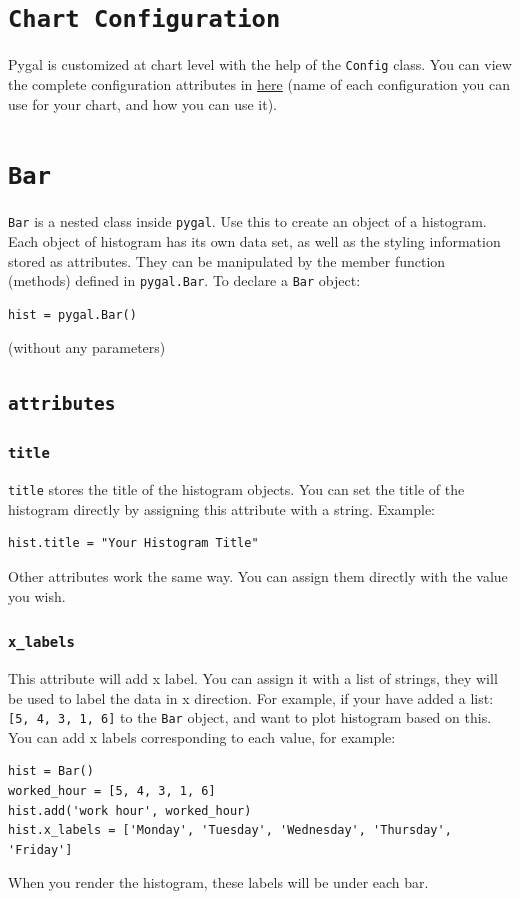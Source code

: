 \documentclass[12pt]{book}
\begin{document}
\section{\texttt{Chart Configuration}}
\label{sec:org21baf3f}
Pygal is customized at chart level with the help of the \texttt{Config} class. You can view the complete configuration attributes in \href{http://www.pygal.org/en/stable/documentation/configuration/chart.html}{here} (name of each configuration you can use for your chart, and how you can use it).
\section{\texttt{Bar}}
\label{sec:org97e6a4d}
\texttt{Bar} is a nested class inside \texttt{pygal}. Use this to create an object of a histogram. Each object of histogram has its own data set, as well as the styling information stored as attributes. They can be manipulated by the member function (methods) defined in \texttt{pygal.Bar}. To declare a \texttt{Bar} object:
\begin{verbatim}
hist = pygal.Bar()
\end{verbatim}
(without any parameters)

\subsection{\texttt{attributes}}
\label{sec:org141d092}
\subsubsection{\texttt{title}}
\label{sec:org6b6034d}
\texttt{title} stores the title of the histogram objects. You can set the title of the histogram directly by assigning this attribute with a string. Example:
\begin{verbatim}
hist.title = "Your Histogram Title"
\end{verbatim}
Other attributes work the same way. You can assign them directly with the value you wish.
\subsubsection{\texttt{x\_labels}}
\label{sec:org98196ee}
This attribute will add x label. You can assign it with a list of strings, they will be used to label the data in x direction. For example, if your have added a list: \texttt{[5, 4, 3, 1, 6]} to the \texttt{Bar} object, and want to plot histogram based on this. You can add x labels corresponding to each value, for example:
\begin{verbatim}
hist = Bar()
worked_hour = [5, 4, 3, 1, 6]
hist.add('work hour', worked_hour)
hist.x_labels = ['Monday', 'Tuesday', 'Wednesday', 'Thursday', 'Friday']
\end{verbatim}
When you render the histogram, these labels will be under each bar.
\end{document}
